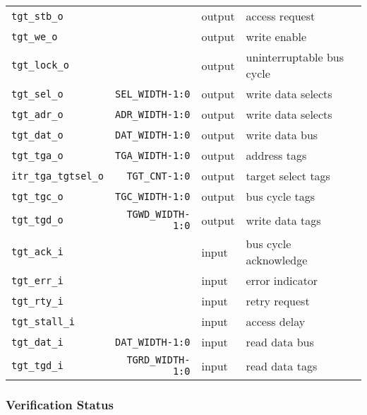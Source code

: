 \begin{center}
\begin{longtable}{|l|r|l|l|}
    \texttt{tgt\_stb\_o}         &                          & output & access request            \\
    \texttt{tgt\_we\_o}          &                          & output & write enable              \\
    \texttt{tgt\_lock\_o}        &                          & output & uninterruptable bus cycle \\
    \texttt{tgt\_sel\_o}         & \texttt{SEL\_WIDTH-1:0}  & output & write data selects        \\
    \texttt{tgt\_adr\_o}         & \texttt{ADR\_WIDTH-1:0}  & output & write data selects        \\
    \texttt{tgt\_dat\_o}         & \texttt{DAT\_WIDTH-1:0 } & output & write data bus            \\
    \texttt{tgt\_tga\_o}         & \texttt{TGA\_WIDTH-1:0}  & output & address tags              \\
    \texttt{itr\_tga\_tgtsel\_o} & \texttt{TGT\_CNT-1:0}    & output & target select tags        \\
    \texttt{tgt\_tgc\_o}         & \texttt{TGC\_WIDTH-1:0}  & output & bus cycle tags            \\
    \texttt{tgt\_tgd\_o}         & \texttt{TGWD\_WIDTH-1:0} & output & write data tags           \\
    \texttt{tgt\_ack\_i}         &                          & input  & bus cycle acknowledge     \\
    \texttt{tgt\_err\_i}         &                          & input  & error indicator           \\
    \texttt{tgt\_rty\_i}         &                          & input  & retry request             \\
    \texttt{tgt\_stall\_i}       &                          & input  & access delay              \\
    \texttt{tgt\_dat\_i}         & \texttt{DAT\_WIDTH-1:0}  & input  & read data bus             \\
    \texttt{tgt\_tgd\_i}         & \texttt{TGRD\_WIDTH-1:0} & input  & read data tags            \\   
  \end{longtable}
\end{center}  
\endgroup

\pagebreak

\subsubsection{Verification Status}
\label{adec:verif}

